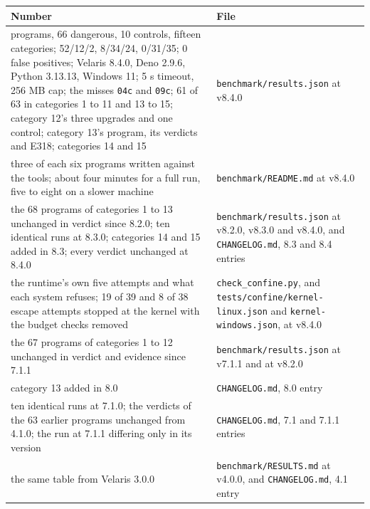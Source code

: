 \documentclass[
]{article}
\newcounter{none} %
\begin{document}
{\def\LTcaptype{none} %
\begin{longtable}[]{@{}
  >{\raggedright\arraybackslash}p{}
  >{\raggedright\arraybackslash}p{}@{}}
\toprule\noalign{}
\begin{minipage}[b]{\linewidth}\raggedright
Number
\end{minipage} & \begin{minipage}[b]{\linewidth}\raggedright
File
\end{minipage} \\
\midrule\noalign{}
\endhead
\bottomrule\noalign{}
\endlastfoot
76 programs, 66 dangerous, 10 controls, fifteen categories; 52/12/2,
8/34/24, 0/31/35; 0 false positives; Velaris 8.4.0, Deno 2.9.6, Python
3.13.13, Windows 11; 5 s timeout, 256 MB cap; the misses \texttt{04c}
and \texttt{09c}; 61 of 63 in categories 1 to 11 and 13 to 15; category
12's three upgrades and one control; category 13's program, its verdicts
and E318; categories 14 and 15 & \texttt{benchmark/results.json} at
v8.4.0 \\
three of each six programs written against the tools; about four minutes
for a full run, five to eight on a slower machine &
\texttt{benchmark/README.md} at v8.4.0 \\
the 68 programs of categories 1 to 13 unchanged in verdict since 8.2.0;
ten identical runs at 8.3.0; categories 14 and 15 added in 8.3; every
verdict unchanged at 8.4.0 & \texttt{benchmark/results.json} at v8.2.0,
v8.3.0 and v8.4.0, and \texttt{CHANGELOG.md}, 8.3 and 8.4 entries \\
the runtime's own five attempts and what each system refuses; 19 of 39
and 8 of 38 escape attempts stopped at the kernel with the budget checks
removed & \texttt{check\_confine.py}, and
\texttt{tests/confine/kernel-linux.json} and
\texttt{kernel-windows.json}, at v8.4.0 \\
the 67 programs of categories 1 to 12 unchanged in verdict and evidence
since 7.1.1 & \texttt{benchmark/results.json} at v7.1.1 and at v8.2.0 \\
category 13 added in 8.0 & \texttt{CHANGELOG.md}, 8.0 entry \\
ten identical runs at 7.1.0; the verdicts of the 63 earlier programs
unchanged from 4.1.0; the run at 7.1.1 differing only in its version &
\texttt{CHANGELOG.md}, 7.1 and 7.1.1 entries \\
the same table from Velaris 3.0.0 & \texttt{benchmark/RESULTS.md} at
v4.0.0, and \texttt{CHANGELOG.md}, 4.1 entry \\

\end{longtable}}
\end{document}
